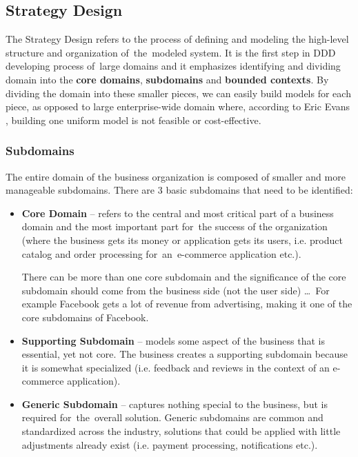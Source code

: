 \subsection{Strategy Design}
\label{ddd:strategy_design}
The Strategy Design refers to the process of defining and modeling the high-level structure and organization of~the~modeled system. It is the first step in DDD developing process of~large domains and it emphasizes identifying and dividing domain into the \textbf{core domains}, \textbf{subdomains} and \textbf{bounded contexts}. By dividing the domain into these smaller pieces, we can easily build models for each piece, as opposed to large enterprise-wide domain where, according to Eric Evans \cite{eric_evans:ddd}, building one uniform model is not feasible or cost-effective.

\subsubsection{Subdomains}
The entire domain of the business organization is composed of smaller and more manageable  subdomains. There are 3 basic subdomains that need to be identified:
\begin{itemize}
    \item \textbf{Core Domain} -- refers to the central and most critical part of a business domain and the most important part for~the success of the organization (where the business gets its money or application gets its users, i.e. product catalog and order processing for~an~e-commerce application etc.).
    
    There can be more than one core subdomain and the significance of the core subdomain should come from the business side (not the user side) \dots~For example Facebook gets a lot of revenue from advertising, making it one of the core subdomains of Facebook.
    
    \item \textbf{Supporting Subdomain} -- models some aspect of the business that is essential, yet not core. The business creates a supporting subdomain because it is somewhat specialized (i.e. feedback and reviews in the context of an e-commerce application).
    
    \item \textbf{Generic Subdomain} -- captures nothing special to the business, but is required for~the~overall solution. Generic subdomains are common and standardized across the industry, solutions that could be applied with little adjustments already exist (i.e. payment processing, notifications etc.).
\end{itemize}

